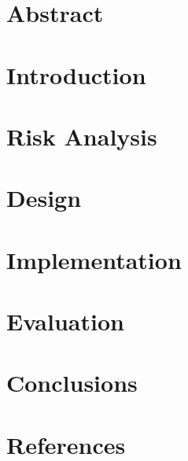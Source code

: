 \documentclass[11pt]{article}
\begin{document}

\clearpage

\onehalfspacing{}

\section*{Abstract}
\label{sec:abstract}

\clearpage

\tableofcontents
\clearpage

\section{Introduction}
\label{sec:intro}


\clearpage
\section{Risk Analysis}
\label{sec:risk}


\clearpage
\section{Design}
\label{sec:design}


\clearpage
\section{Implementation}
\label{sec:impl}


\clearpage
\section{Evaluation}
\label{sec:eval}


\clearpage
\section{Conclusions}
\label{sec:conclusions}


\newpage
\section{References}
\begingroup
\renewcommand{\section}[2]{}%

\endgroup
\end{document}
